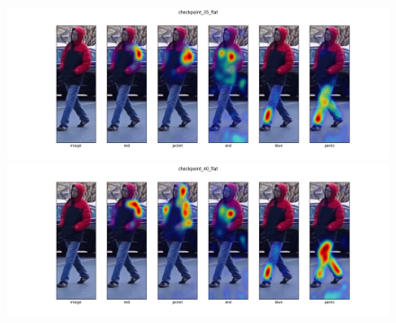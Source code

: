 \begin{figure}
  \includegraphics[width=\linewidth]{img/mrtd_masking_ratio/mrtd-checkpoint_35_flat.png}\includegraphics[width=\linewidth]{img/mrtd_masking_ratio/mrtd-checkpoint_40_flat.png}
  
  
\end{figure}